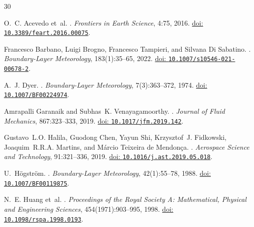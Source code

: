 \documentclass[11pt,a4paper]{article}
\begin{document}

\begin{thebibliography}{30}
\providecommand{\natexlab}[1]{#1}
\providecommand{\url}[1]{\texttt{#1}}
\providecommand{\doi}[1]{\href{https://doi.org/#1}{doi: \nolinkurl{#1}}}

O.~C. Acevedo et~al.
.
\newblock \emph{Frontiers in Earth Science}, 4:75, 2016.
\newblock \doi{10.3389/feart.2016.00075}.

Francesco Barbano, Luigi Brogno, Francesco Tampieri, and Silvana Di Sabatino.
.
\newblock \emph{Boundary-Layer Meteorology}, 183(1):35--65, 2022.
\newblock \doi{10.1007/s10546-021-00678-2}.

A.~J. Dyer.
.
\newblock \emph{Boundary-Layer Meteorology}, 7(3):363--372, 1974.
\newblock \doi{10.1007/BF00224974}.

Amrapalli Garanaik and Subhas~K. Venayagamoorthy.
.
\newblock \emph{Journal of Fluid Mechanics}, 867:323--333, 2019.
\newblock \doi{10.1017/jfm.2019.142}.

Gustavo~L.O. Halila, Guodong Chen, Yayun Shi, Krzysztof~J. Fidkowski, Joaquim~R.R.A. Martins, and M\'arcio Teixeira de Mendon\c{c}a.
.
\newblock \emph{Aerospace Science and Technology}, 91:321--336, 2019.
\newblock \doi{10.1016/j.ast.2019.05.018}.

U.~Högström.
.
\newblock \emph{Boundary-Layer Meteorology}, 42(1):55--78, 1988.
\newblock \doi{10.1007/BF00119875}.

N.~E. Huang et~al.
.
\newblock \emph{Proceedings of the Royal Society A: Mathematical, Physical and Engineering Sciences}, 454(1971):903--995, 1998.
\newblock \doi{10.1098/rspa.1998.0193}.


\end{thebibliography}
\end{document}

